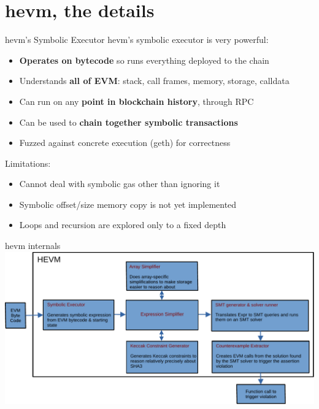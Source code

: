 \documentclass[aspectratio=169]{beamer}
\begin{document}
\section{hevm, the details}

\begin{frame}{hevm's Symbolic Executor}
hevm's symbolic executor is very powerful:
\begin{itemize}
\item \textbf{Operates on bytecode} so runs everything deployed to the chain
\item Understands \textbf{all of EVM}: stack, call frames, memory, storage, calldata
\item Can run on any \textbf{point in blockchain history}, through RPC
\item Can be used to \textbf{chain together symbolic transactions}
\item Fuzzed against concrete execution (geth) for correctness
\end{itemize}
\bigskip

Limitations:
\begin{itemize}
\item Cannot deal with symbolic gas other than ignoring it
\item Symbolic offset/size memory copy is not yet implemented
\item Loops and recursion are explored only to a fixed depth
\end{itemize}
\end{frame}

\begin{frame}{hevm internals}
\centering
\includegraphics[scale=0.6]{hevm-overview}

\end{frame}
\end{document}
